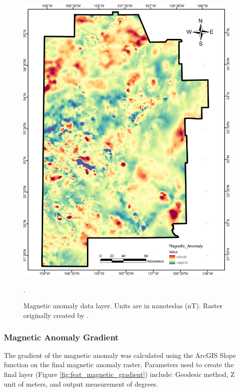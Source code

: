 \begin{figure}[!htp]
\centering
\includegraphics[scale=.50]{templates/images/Figure-MagneticAnomaly.png}
\caption[Magnetic anomaly data layer]{Magnetic anomaly data layer. Units are in nanoteslas (nT). Raster originally created by \protect\citet{bielicki_hydrogeolgic_2015}.}.
\label{fig:feat_magnetics}
\end{figure}

\subsubsection{Magnetic Anomaly Gradient}

The gradient of the magnetic anomaly was calculated using the ArcGIS Slope function on the final magnetic anomaly raster. Parameters used to create the final layer (Figure \ref{fig:feat_magnetic_gradient}) include: Geodesic method, Z unit of meters, and output measurement of degrees.

